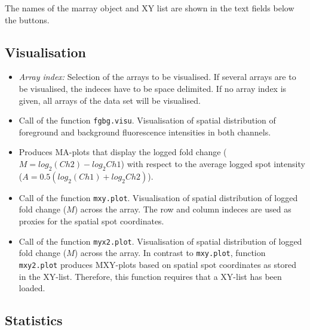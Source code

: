 \documentclass[a4paper,11pt]{article}
\begin{document}
The names of the marray object and XY list are shown in the text fields below the buttons.



\subsection{Visualisation}

\begin{itemize}
\item \textit{Array index:} Selection of the arrays to be visualised. If several arrays are to
be visualised, the indeces have to  be space delimited. If no array index is given, all
arrays of the data set will  be visualised.
 
\item {} Call of the function \texttt{fgbg.visu}. Visualisation of spatial  
 distribution of foreground and background fluorescence  intensities in both channels.

\item {} Produces  MA-plots that  display the logged fold change 
($M=log_{2}(Ch2) - log_{2}{Ch1}$) with respect to the average logged spot intensity  ($A=0.5(log_{2}(Ch1) + log_{2}{Ch2})$).

\item {} Call of the function \texttt{mxy.plot}. Visualisation of spatial distribution of logged fold change ($M$) across the array. The row and column indeces are used
as proxies for the spatial spot coordinates.

\item {} Call of the function \texttt{myx2.plot}. Visualisation of spatial distribution of logged fold change ($M$) across the array. In contrast to \texttt{mxy.plot},
function \texttt{mxy2.plot} produces MXY-plots based on spatial spot coordinates as stored
in the XY-list. Therefore, this function requires that a XY-list has been loaded. 


\end{itemize}

\subsection{Statistics}
\end{document}
